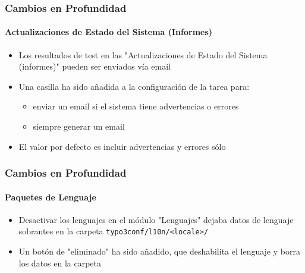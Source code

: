 \begin{frame}[fragile]
	\frametitle{Cambios en Profundidad}
	\framesubtitle{Actualizaciones de Estado del Sistema (Informes)}

	\begin{itemize}
		\item Los resultados de test en las "Actualizaciones de Estado del Sistema (informes)" pueden ser enviados vía email
		\item Una casilla ha sido añadida a la configuración de la tarea para:

			\begin{itemize}
				\item enviar un email si el sistema tiene advertencias o errores
				\item siempre generar un email
			\end{itemize}

		\item El valor por defecto es incluir advertencias y errores sólo

	\end{itemize}

\end{frame}







\begin{frame}[fragile]
	\frametitle{Cambios en Profundidad}
	\framesubtitle{Paquetes de Lenguaje}

	\begin{itemize}
		\item Desactivar los lenguajes en el módulo "Lenguajes" dejaba datos de lenguaje sobrantes
			en la carpeta \texttt{typo3conf/l10n/<locale>/}
		\item Un botón de "eliminado" ha sido añadido, que deshabilita el lenguaje y borra los
			datos en la carpeta
	\end{itemize}

\end{frame}








